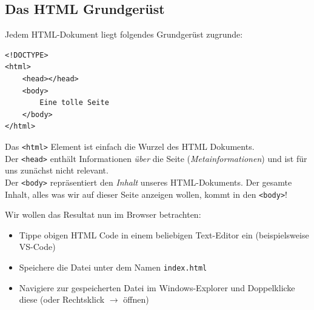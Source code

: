 \documentclass[ngerman,11pt]{article}
\begin{document}



    \subsection{Das HTML Grundgerüst}

    Jedem HTML-Dokument liegt folgendes Grundgerüst zugrunde:

    \begin{lstlisting}[style=htmlcssjs]
<!DOCTYPE>
<html>
    <head></head>
    <body>
        Eine tolle Seite
    </body>
</html>
    \end{lstlisting}

    Das \verb_<html>_ Element ist einfach die Wurzel des HTML Dokuments. \\
    Der \verb_<head>_ enthält Informationen \textit{über} die Seite (\textit{Metainformationen})
    und ist für uns zunächst nicht relevant. \\
    Der \verb_<body>_ repräsentiert den \textit{Inhalt} unseres HTML-Dokuments.
    Der gesamte Inhalt, alles was wir auf dieser Seite anzeigen wollen, kommt in den \verb_<body>_!


    Wir wollen das Resultat nun im Browser betrachten:
    \begin{itemize}
        \item Tippe obigen HTML Code in einem beliebigen Text-Editor ein (beispielsweise VS-Code)
        \item Speichere die Datei unter dem Namen \lstinline{index.html}
        \item Navigiere zur gespeicherten Datei im Windows-Explorer und Doppelklicke diese (oder Rechtsklick $\rightarrow$ öffnen)
    \end{itemize}

\end{document}
